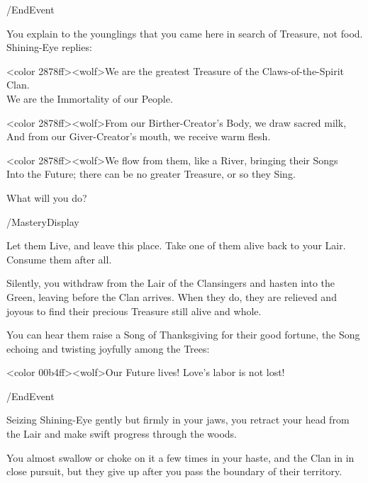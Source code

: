 \option /EndEvent  
 
   


You explain to the younglings that you came here in search of Treasure, not
food. Shining-Eye replies:

<color 2878ff><wolf>We are the greatest Treasure of the Claws-of-the-Spirit
Clan.\\ We are the Immortality of our People.

<color 2878ff><wolf>From our Birther-Creator's Body, we draw sacred milk,\\
And from our Giver-Creator's mouth, we receive warm flesh.

<color 2878ff><wolf>We flow from them, like a River, bringing their Songs\\
Into the Future; there can be no greater Treasure, or so they Sing.


What will you do?

/MasteryDisplay

\option Let them Live, and leave this place. 
\option Take one of them alive back to your Lair. 
\option Consume them after all.
	  


Silently, you withdraw from the Lair of the Clansingers and hasten into the
Green, leaving before the Clan arrives. When they do, they are relieved and
joyous to find their precious Treasure still alive and whole.

You can hear them raise a Song of Thanksgiving for their good fortune, the Song
echoing and twisting joyfully among the Trees:

<color 00b4ff><wolf>Our Future lives! Love's labor is not lost!

\option /EndEvent   
   


Seizing Shining-Eye gently but firmly in your jaws, you retract your head from
the Lair and make swift progress through the woods.

You almost swallow or choke on it a few times in your haste, and the Clan in in
close pursuit, but they give up after you pass the boundary of their territory.


